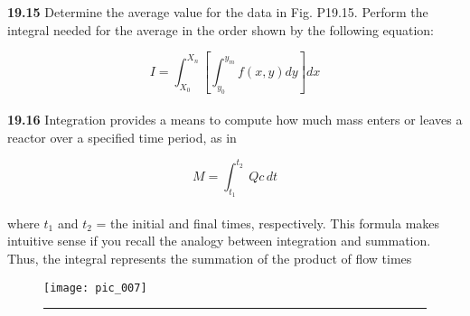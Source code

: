\documentclass[../main.tex]{subfiles}
\begin{document}
\begin{multicols}{2}
\textbf{19.15} Determine the average value for the data in Fig. P19.15.
Perform the integral needed for the average in the order shown
by the following equation:
	
	$$I=\int^{X_{n}}_{X_{0}}\left[\int^{y_{m}}_{y_{0}} f(x,y)dy \right]dx$$\\
	
\textbf{19.16} Integration provides a means to compute how much
mass enters or leaves a reactor over a specified time period,
as in

	$$M=\int^{t_2}_{t_1}\ Q c\,dt$$\\
where $t_1$ and $t_2$ = the initial and final times, respectively.
This formula makes intuitive sense if you recall the analogy
between integration and summation. Thus, the integral
represents the summation of the product of flow times

\end{multicols}

\begin{figure}[hbt!]
	\centering
	\texttt{[image: pic\_007]}
	\caption{\textsf{}} \hrule
	\label{pic.007}
\end{figure}
\end{document}
